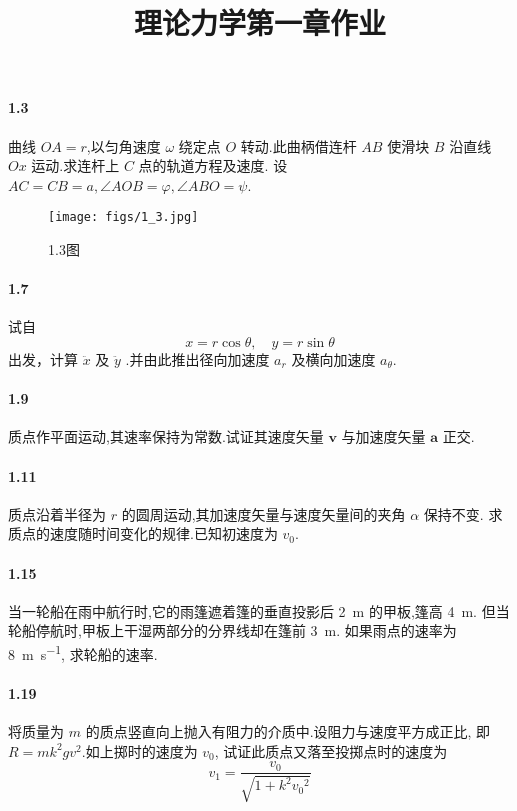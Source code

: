 \documentclass[UTF8,a4paper]{ctexart}
\title{理论力学第一章作业}
\date{}
\author{}
\begin{document}
\maketitle
	
\paragraph{1.3} 曲线 $ OA = r $,以匀角速度 $ \omega $ 绕定点 $ O $ 转动.此曲柄借连杆 $ AB $ 使滑块 $ B $ 沿直线 $ Ox $ 运动.求连杆上 $ C $ 点的轨道方程及速度. 设 $ AC = CB = a, \angle AOB = \varphi , \angle ABO = \psi $.
	\begin{figure}[h]
		\centering
		\texttt{[image: figs/1\_3.jpg]}
		\caption{1.3图}
	\end{figure}


\paragraph{1.7} 试自 \[ x = r \cos \theta , \quad y = r \sin \theta\] 出发，计算 $ \ddot{x} $ 及 $ \ddot{y} $ .并由此推出径向加速度 $ a_r $ 及横向加速度 $ a_\theta $.


\paragraph{1.9} 质点作平面运动,其速率保持为常数.试证其速度矢量 $ \boldsymbol{v} $ 与加速度矢量 $ \boldsymbol{a} $ 正交.

	
\paragraph{1.11} 质点沿着半径为 $ r $ 的圆周运动,其加速度矢量与速度矢量间的夹角 $ \alpha $ 保持不变. 求质点的速度随时间变化的规律.已知初速度为 $ v_0 $.


\paragraph{1.15} 当一轮船在雨中航行时,它的雨篷遮着篷的垂直投影后 \SI{2}{\metre} 的甲板,篷高 \SI{4}{\meter}. 但当轮船停航时,甲板上干湿两部分的分界线却在篷前 \SI{3}{\metre}. 如果雨点的速率为 \SI{8}{\meter \per \second}, 求轮船的速率.


\paragraph{1.19} 将质量为 $ m $ 的质点竖直向上抛入有阻力的介质中.设阻力与速度平方成正比, 即 $ R = m k^2 g v^2 $.如上掷时的速度为 $ v_0 $, 试证此质点又落至投掷点时的速度为\[ v_1 = \frac{ v_0 }{ \sqrt{1+k^2 {v_0}^2}} \]
\end{document}
